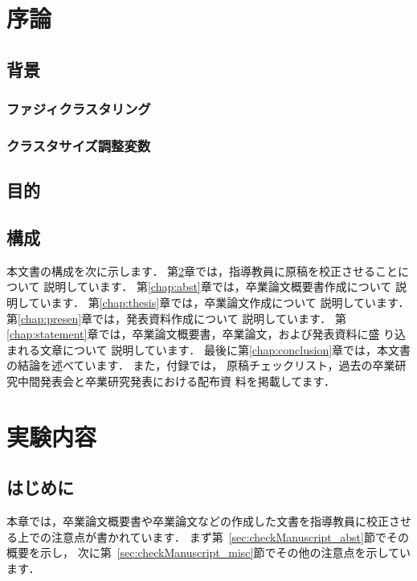 \documentclass[a4j,12pt,dvipdfmx,oneside]{jsbook}
\theoremstyle{definition}
\begin{document}
\pagestyle{headings}
\def\thepage{\roman{page}}

\tableofcontents
\listoffigures
\listoftables
\newpage
\pagestyle{myheadings}
%
%
%
\chapter{序論}
\def\thepage{\arabic{page}}
\setcounter{page}{1}
\label{chap:first}
%
%
%
\section{背景}\label{sec:background}
%
%
%
\subsection{ファジィクラスタリング}\label{subsec:latex}
%
%
%

%
%
%
\subsection{クラスタサイズ調整変数}\label{subsec:academic_statement}
%
%
%

%
%
%
\section{目的}\label{sec:purpose}
%
%
%

%
%
%
\section{構成}\label{sec:contents}
%
%
%
本文書の構成を次に示します．
第\ref{chap:checkManuscript}章では，指導教員に原稿を校正させることについて
説明しています．
第\ref{chap:abst}章では，卒業論文概要書作成について
説明しています．
第\ref{chap:thesis}章では，卒業論文作成について
説明しています．
第\ref{chap:presen}章では，発表資料作成について
説明しています．
第\ref{chap:statement}章では，卒業論文概要書，卒業論文，および発表資料に盛
り込まれる文章について
説明しています．
最後に第\ref{chap:conclusion}章では，本文書の結論を述べています．
また，付録では，
原稿チェックリスト，過去の卒業研究中間発表会と卒業研究発表における配布資
料を掲載してます．
%
%
%
\chapter{実験内容}\label{chap:checkManuscript}
%
%
%
\section{はじめに}\label{sec:checkManuscript_intro}
本章では，卒業論文概要書や卒業論文などの作成した文書を指導教員に校正させ
る上での注意点が書かれています．
まず第~\ref{sec:checkManuscript_abst}節でその概要を示し，
次に第~\ref{sec:checkManuscript_misc}節でその他の注意点を示しています．
%
%
%
\end{document}
